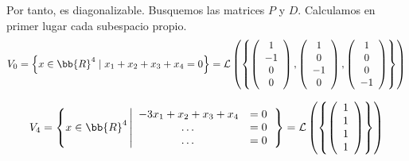 \begin{ejercicio}
    Por tanto, es diagonalizable. Busquemos las matrices $P$ y $D$. Calculamos en primer lugar cada subespacio propio.
    \begin{equation*}
        V_0 = \left\{x\in\bb{R}^4 \mid x_1+x_2+x_3+x_4 = 0\right\} = \mathcal{L}\left(\left\{ \left(\begin{array}{c}
                1 \\
                - 1 \\
                0 \\
                0 \\
           \end{array}\right),
           \left(\begin{array}{c}
                1 \\
                0 \\
                -1 \\
                0 \\
           \end{array}\right),
           \left(\begin{array}{c}
                1 \\
                0 \\
                0 \\
                -1 \\
           \end{array}\right)
           \right\}\right)
    \end{equation*}

    \begin{equation*}
        V_4 = \left\{x\in\bb{R}^4 \left| 
        \begin{array}{cl}
            -3x_1+x_2+x_3+x_4 & = 0  \\
            \dots & = 0  \\
            \dots & = 0  \\
        \end{array}\right.
        \right\} = \mathcal{L}\left(\left\{ \left(\begin{array}{c}
                1 \\
                1 \\
                1 \\
                1 \\
           \end{array}\right)
           \right\}\right)
    \end{equation*}


\end{ejercicio}
